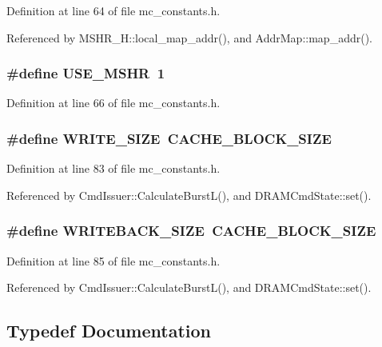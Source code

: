 Definition at line 64 of file mc\_\-constants.h.

Referenced by MSHR\_\-H::local\_\-map\_\-addr(), and AddrMap::map\_\-addr().
\subsubsection[{USE\_\-MSHR}]{\setlength{\rightskip}{0pt plus 5cm}\#define {\bf USE\_\-MSHR}~1}\label{mc__constants_8h_6021de24ebedf19345f1d5a34fc92c22}




Definition at line 66 of file mc\_\-constants.h.
\subsubsection[{WRITE\_\-SIZE}]{\setlength{\rightskip}{0pt plus 5cm}\#define {\bf WRITE\_\-SIZE}~{\bf CACHE\_\-BLOCK\_\-SIZE}}\label{mc__constants_8h_dffc7bcd50015cae98ad6b1f3e240c03}




Definition at line 83 of file mc\_\-constants.h.

Referenced by CmdIssuer::CalculateBurstL(), and DRAMCmdState::set().
\subsubsection[{WRITEBACK\_\-SIZE}]{\setlength{\rightskip}{0pt plus 5cm}\#define {\bf WRITEBACK\_\-SIZE}~{\bf CACHE\_\-BLOCK\_\-SIZE}}\label{mc__constants_8h_9117e1b8ef1ac1f3fea5da3f3b883c9d}




Definition at line 85 of file mc\_\-constants.h.

Referenced by CmdIssuer::CalculateBurstL(), and DRAMCmdState::set().

\subsection{Typedef Documentation}
